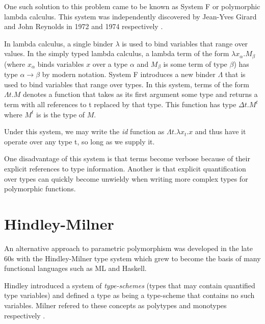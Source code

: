 \documentclass{ProgressReport}[2020/09/15]
\begin{document}
          One such solution to this problem came to be known as System F
          or polymorphic lambda calculus. This system was independently
          discovered by Jean-Yves Girard and John Reynolds in 1972 and 1974
          respectively \cite{Girard1972,reynolds1974}.
      
          In lambda calculus, a single binder $\lambda$ is used to bind variables
          that range over values. In the simply typed lambda calculus, a
          lambda term of the form $\lambda x_{\alpha}.M_{\beta}$ (where
          $x_{\alpha}$ binds variables $x$ over a type $\alpha$ and
          $M_{\beta}$ is some term of type $\beta $) has type
          $\alpha\to\beta$ by modern notation. System F introduces a new
          binder $\Lambda$ that is used to bind variables that range over
          types. In this system, terms of the form $\Lambda t.M$ denotes a
          function that takes as its first argument some type and returns a
          term with all references to t replaced by that type. This function
          has type $\Delta t.M^{t}$ where $M^t$ is is the type of $M$.
      
          Under this system, we may write the \emph{id} function as $\Lambda t
          . \lambda x_t . x$ and thus have it operate over any type t,
          so long as we supply it.
      
          One disadvantage of this system is that terms become verbose
          because of their explicit references to type
          information. Another is that explicit quantification over
          types can quickly become unwieldy when writing more complex
          types for polymorphic functions.

          \section{Hindley-Milner}
            An alternative approach to parametric polymorphism was
            developed in the late 60s with the Hindley-Milner type
            system which grew to become the basis of many functional
            languages such as ML and Haskell.
                        
            Hindley introduced a system of \textit{type-schemes}
            \cite{hindley1969} (types that may contain quantified type
            variables) and defined a type as being a type-scheme that
            contains no such variables. Milner refered to these
            concepts as polytypes and monotypes respectively
            \cite{milner1978}. 
            
\end{document}
